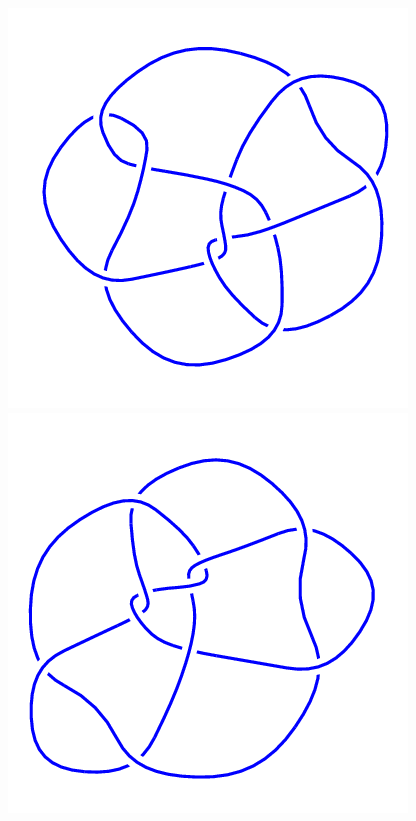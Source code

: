 \begin{figure}[H]
    \begin{minipage}[b]{.18\linewidth}
        \centering
        \includegraphics[width=\linewidth]{../data/10_97.png}
    \end{minipage}
    \begin{minipage}[b]{.18\linewidth}
        \centering
        \includegraphics[width=\linewidth]{../data/10_98.png}

\end{minipage}
\end{figure}
